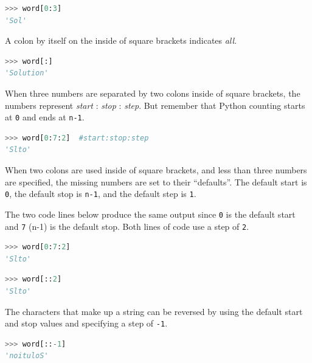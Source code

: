\documentclass{book}
\begin{document}
\begin{lstlisting}[language=Python]
>>> word[0:3]
'Sol'
\end{lstlisting}
    




    
        A colon by itself on the inside of square brackets indicates \emph{all}.

\begin{lstlisting}[language=Python]
>>> word[:]
'Solution'
\end{lstlisting}
    




    
        When three numbers are separated by two colons inside of square
brackets, the numbers represent \emph{start} : \emph{stop} :
\emph{step}. But remember that Python counting starts at \lstinline!0!
and ends at \lstinline!n-1!.

\begin{lstlisting}[language=Python]
>>> word[0:7:2]  #start:stop:step
'Slto'
\end{lstlisting}
    




    
        When two colons are used inside of square brackets, and less than three
numbers are specified, the missing numbers are set to their
``defaults''. The default start is \lstinline!0!, the default stop is
\lstinline!n-1!, and the default step is \lstinline!1!.

The two code lines below produce the same output since \lstinline!0! is
the default start and \lstinline!7! (n-1) is the default stop. Both
lines of code use a step of \lstinline!2!.

\begin{lstlisting}[language=Python]
>>> word[0:7:2]
'Slto'
\end{lstlisting}

\begin{lstlisting}[language=Python]
>>> word[::2]
'Slto'
\end{lstlisting}

The characters that make up a string can be reversed by using the
default start and stop values and specifying a step of \lstinline!-1!.

\begin{lstlisting}[language=Python]
>>> word[::-1]
'noituloS'
\end{lstlisting}
    
\end{document}
